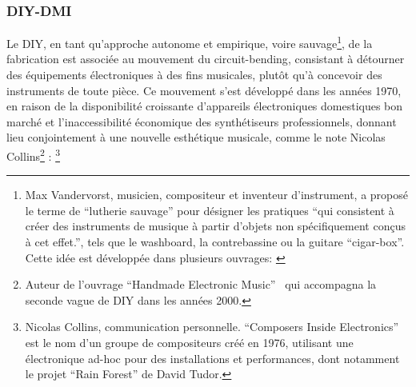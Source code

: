 \subsubsection{DIY-DMI}

\noindent Le \gls{DIY}, en tant qu'approche autonome et empirique, voire sauvage\footnote{Max Vandervorst, musicien, compositeur et inventeur d'instrument, a proposé le terme de ``lutherie sauvage'' pour désigner les pratiques ``qui consistent à créer des instruments de musique à partir d'objets non spécifiquement conçus à cet effet.'', tels que le washboard, la contrebassine ou la guitare ``cigar-box''. Cette idée est développée dans plusieurs ouvrages: \cite{vandervorst_lutherie_1997, vandervorst_instruments_2012}}, de la fabrication est associée au mouvement du \gls{circuit-bending}, consistant à détourner des équipements électroniques à des fins musicales, plutôt qu'à concevoir des instruments de toute pièce. Ce mouvement s'est développé dans les années 1970, en raison de la disponibilité croissante d'appareils électroniques domestiques bon marché et l'inaccessibilité économique des synthétiseurs professionnels, donnant lieu conjointement à une nouvelle esthétique musicale, comme le note Nicolas Collins\footnote{Auteur de l'ouvrage ``Handmade Electronic Music''~\cite{collins_handmade_2006} qui accompagna la seconde vague de \gls{DIY} dans les années 2000.} :  \footnote{ Nicolas Collins, communication personnelle. ``Composers Inside Electronics'' est le nom d'un groupe de compositeurs créé en 1976, utilisant une électronique ad-hoc pour des installations et performances, dont notamment le projet ``Rain Forest'' de David Tudor.}\\
